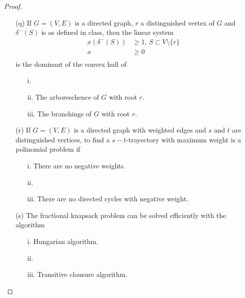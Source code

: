 \begin{proof}
\begin{itemize}
        \item[(q)] If $G = (V, E)$ is a directed graph, $r$ a distinguished vertex of $G$ and
                 $\delta^-(S)$ is as defined in class, then the linear system
                \begin{align}
                            x(\delta^-(S))  &\geq 1,\, S \subset V \setminus \{r\}         \\
                            x               &\geq 0    \\                
                \end{align}
                is the dominant of the convex hull of
                    \begin{itemize}
                        \item[i.] 
                        \item[ii.] The arboreschence of $G$ with root $r$.
                        \item[iii.] The branchings of $G$ with root $r$.
                    \end{itemize}

        \item[(r)] If $G = (V, E)$ is a directed graph with weighted edges and $s$ and $t$ are distinguished
                 vertices, to find a $s-t$-trayectory with maximum weight is a polinomial problem if
                    \begin{itemize}
                        \item[i.] There are no negative weights.
                        \item[ii.] 
                        \item[iii.] There are no directed cycles with negative weight.
                    \end{itemize}

        \item[(s)] The fractional knapsack problem can be solved efficiently with the algorithm
                    \begin{itemize}
                        \item[i.] Hungarian algorithm.
                        \item[ii.] 
                        \item[iii.] Transitive clousure algorithm.
                    \end{itemize}


\end{itemize}
\end{proof}
